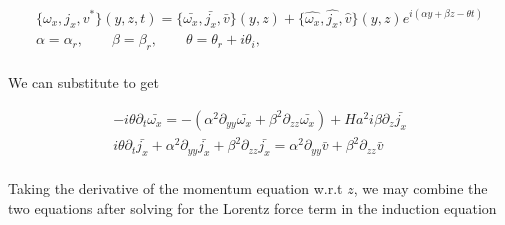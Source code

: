 \documentclass[11pt]{article}
\newcommand{\PD}{\partial}
\begin{document}
\begin{equation}\begin{aligned}
\{\omega_x,j_x,v^*\}(y,z,t) = \{\bar{\omega_x},\bar{j_x},\bar{v}\}(y,z) + \{\hat{\omega_x},\hat{j_x},\hat{v}\} (y,z) e^{i(\alpha y + \beta z - \theta t)} \\
\alpha = \alpha_r, \qquad \beta = \beta_r, \qquad \theta = \theta_r + i \theta_i,  \\
\end{aligned}\end{equation}

We can substitute to get

\begin{equation}\begin{aligned}
-i\theta \PD_t \bar{\omega_x} = - (\alpha^2 \PD_{yy} \bar{\omega_x} + \beta^2 \PD_{zz} \bar{\omega_x}) + Ha^2 i \beta \PD_z \bar{j_x} \\
i\theta \PD_t \bar{j_x} + \alpha^2 \PD_{yy} \bar{j_x} + \beta^2 \PD_{zz} \bar{j_x} = \alpha^2 \PD_{yy} \bar{v} + \beta^2 \PD_{zz} \bar{v} \\
\end{aligned}\end{equation}

Taking the derivative of the momentum equation w.r.t $z$, we may combine the two equations
after solving for the Lorentz force term in the induction equation
\end{document}
